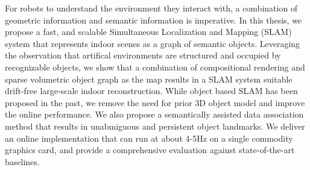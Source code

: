 
\setlength{\parskip}{1em}
\setlength{\parindent}{0em}

\noindent
For robots to understand the environment they interact with, a combination of geometric information and semantic information is imperative. In this thesis, we propose a fast, and scalable Simultaneous Localization and Mapping (SLAM) system that represents indoor scenes as a graph of semantic objects. Leveraging the observation that artifical environments are structured and occupied by recognizable objects, we show that a combination of compositional rendering and sparse volumetric object graph as the map results in a SLAM system suitable drift-free large-scale indoor reconstruction. While object based SLAM has been proposed in the past, we remove the need for prior 3D object model and improve the online performance. We also propose a semantically assisted data association method that results in unabmiguous and persistent object landmarks. We deliver an online implementation that can run at about 4-5Hz on a single commodity graphics card, and provide a comprehensive evaluation against state-of-the-art baselines.
